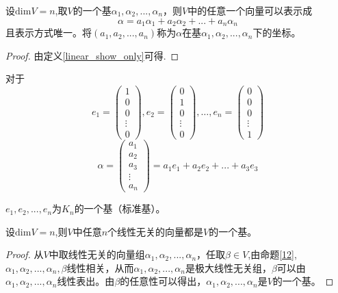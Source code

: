\documentclass[blue,normal,cn]{elegantnote}
\begin{document}
\begin{definition}
    设$\mathrm{dim} V=n$,取$V$的一个基$α_1,α_2,...,α_n$，则$V$中的任意一个向量可以表示成
    \begin{equation*}
        α=a_1 α_1+a_2  α_2+...+a_n  α_n
    \end{equation*}
    且表示方式唯一。将$(a_1,a_2,...,a_n)$称为$α$在基$α_1,α_2,...,α_n$下的坐标。
\end{definition}

\begin{proof}
    由定义\ref{linear_show_only}可得.
\end{proof}

对于
\begin{equation*}
     e_1=\begin{pmatrix} 
            1\\
            0\\
            0\\
            \vdots\\
            0
         \end{pmatrix}
         ,e_2=\begin{pmatrix} 
                0\\
                1\\
                0\\
                \vdots\\
                0
            \end{pmatrix}
            ,\dots
        ,e_n=\begin{pmatrix} 
            0\\
            0\\
            0\\
            \vdots\\
            1
         \end{pmatrix}
\end{equation*}
\begin{equation*}
    α=\begin{pmatrix} 
        a_1\\
        a_2\\
        a_3\\
        \vdots\\
        a_n
     \end{pmatrix}
     =a_1e_1+a_2e_2+...+a_3e_3
\end{equation*}

$e_1,e_2,...,e_n$为$K_n$的一个基（标准基）。

\begin{proposition}
    设$\mathrm{dim} V=n$,则$V$中任意$n$个线性无关的向量都是$V$的一个基。
\end{proposition}

\begin{proof}
    从$V$中取线性无关的向量组$α_1,α_2,...,α_n$，任取$β ∈ V$,由命题\ref{12},$α_1,α_2,...,α_n,β$线性相关，从而$α_1,α_2,...,α_n$是极大线性无关组，$β$可以由$α_1,α_2,...,α_n$线性表出。由$β$的任意性可以得出，$α_1,α_2,...,α_n$是$V$的一个基。
\end{proof}
\end{document}
